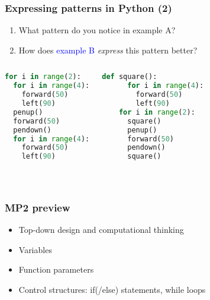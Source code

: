 \begin{frame}
\frametitle<presentation>{Expressing patterns in Python (2)}

\begin{enumerate}
	\item What pattern do you notice in \alert{example A}?
	\item How does \textcolor{blue}{example B} \textit{express} this pattern better?
	
\end{enumerate}




\begin{columns}[T]
\begin{tcolorbox}[colback=white!5,colframe=red!40!black,title=Example A ]
\begin{lstlisting}[language=Python]
for i in range(2):
  for i in range(4):
    forward(50)
    left(90)
  penup()
  forward(50)
  pendown()
  for i in range(4):
    forward(50)
    left(90)
	
\end{lstlisting}
\end{tcolorbox}


\begin{tcolorbox}[colback=white!5,colframe=blue!40!black,title=Example B ]
	\begin{lstlisting}[language=Python]
	def square():
	  for i in range(4):
	    forward(50)
	    left(90)
	for i in range(2):
	  square()
	  penup()
	  forward(50)
	  pendown()
	  square()
	
	
	\end{lstlisting}
\end{tcolorbox}
\end{columns}


\end{frame}

\begin{frame}
\frametitle<presentation>{MP2 preview}
\begin{itemize}
	\item<1-> Top-down design and computational thinking
	\item<2-> Variables
	\item<3-> Function parameters
	\item<4-> Control structures: if(/else) statements, while loops
\end{itemize}
\end{frame}


